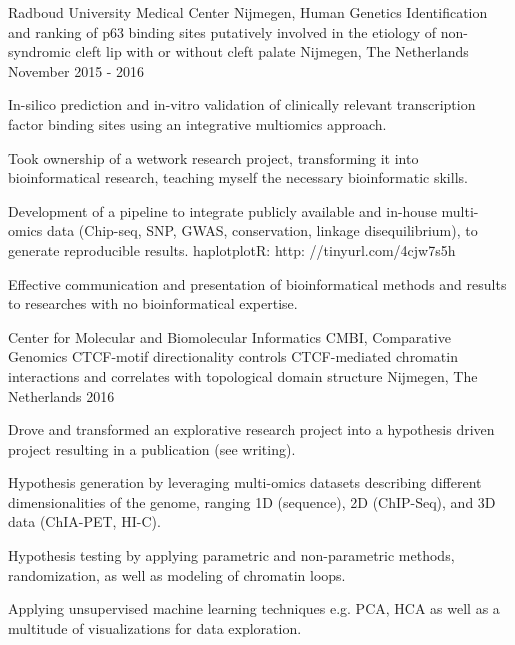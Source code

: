 

\begin{cventries}
  \cventry
    { Radboud University Medical Center Nijmegen, Human Genetics } %
    { Identification and ranking of p63 binding sites putatively involved in the etiology of non-syndromic cleft lip with or without cleft palate } %
    { Nijmegen, The Netherlands } %
    { November 2015 - 2016 } %
    { 
      \begin{cvitems} %
\item { In-silico prediction and in-vitro validation of clinically relevant transcription factor binding sites using an integrative multiomics approach. }
\item { Took ownership of a wetwork research project, transforming it into bioinformatical research, teaching myself the necessary bioinformatic skills. }
\item { Development of a pipeline to integrate publicly available and in-house multi-omics data (Chip-seq, SNP, GWAS, conservation, linkage disequilibrium), to generate reproducible results. haplotplotR: http: //tinyurl.com/4cjw7s5h }
\item { Effective communication and presentation of bioinformatical methods and results to researches with no bioinformatical expertise. }
      \end{cvitems}
    }

  \cventry
    { Center for Molecular and Biomolecular Informatics CMBI, Comparative Genomics } %
    { CTCF-motif directionality controls CTCF-mediated chromatin interactions and correlates with topological domain structure } %
    { Nijmegen, The Netherlands } %
    { 2016 } %
    { 
      \begin{cvitems} %
\item { Drove and transformed an explorative research project into a hypothesis driven project resulting in a publication (see writing). }
\item { Hypothesis generation by leveraging multi-omics datasets describing different dimensionalities of the genome, ranging 1D (sequence), 2D (ChIP-Seq), and 3D data (ChIA-PET, HI-C). }
\item { Hypothesis testing by applying parametric and non-parametric methods, randomization, as well as modeling of chromatin loops. }
\item { Applying unsupervised machine learning techniques e.g. PCA, HCA as well as a multitude of visualizations for data exploration. }
      \end{cvitems}
    }

\end{cventries}
\newpage